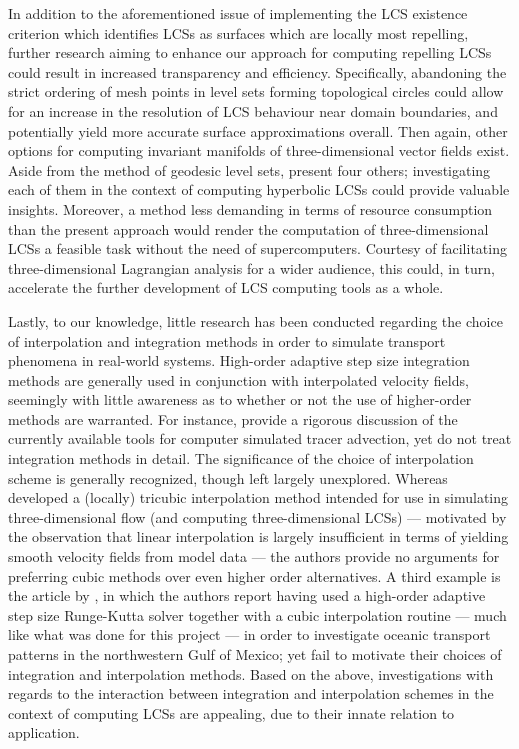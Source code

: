 In addition to the aforementioned issue of implementing the LCS existence
criterion which identifies LCSs as surfaces which are locally most repelling,
further research aiming to enhance our approach for computing repelling LCSs
could result in increased transparency and efficiency. Specifically,
abandoning the strict ordering of mesh points in level sets forming topological
circles could allow for an increase in the resolution of LCS behaviour near
domain boundaries, and potentially yield more accurate surface approximations
overall. Then again, other options for computing invariant manifolds of
three-dimensional vector fields exist. Aside from the method of geodesic level
sets, \textcite{krauskopf2005survey} present four others; investigating each of
them in the context of computing hyperbolic LCSs could provide valuable
insights. Moreover, a method less demanding in terms of resource
consumption than the present approach would render the computation of
three-dimensional LCSs a feasible task without the need of supercomputers.
Courtesy of facilitating three-dimensional Lagrangian analysis for a wider
audience, this could, in turn, accelerate the further development of LCS
computing tools as a whole.

Lastly, to our knowledge, little research has been conducted regarding the
choice of interpolation and integration methods in order to simulate transport
phenomena in real-world systems. High-order adaptive step size integration
methods are generally used in conjunction with interpolated velocity fields,
seemingly with little awareness as to whether or not the use of higher-order
methods are warranted. For instance, \textcite{vansebille2018lagrangian}
provide a rigorous discussion of the currently available tools for computer
simulated tracer advection, yet do not treat integration methods in detail.
The significance of the choice of interpolation scheme is generally recognized,
though left largely unexplored. Whereas \textcite{lekien2005tricubic} developed
a (locally) tricubic interpolation method intended for use in simulating
three-dimensional flow (and computing three-dimensional LCSs) --- motivated by
the observation that linear interpolation is largely insufficient in terms of
yielding smooth velocity fields from model data --- the authors provide no
arguments for preferring cubic methods over even higher order alternatives. A
third example is the article by \textcite{gough2017persistent}, in which the
authors report having used a high-order adaptive step size Runge-Kutta solver
together with a cubic interpolation routine --- much like what was done for
this project --- in order to investigate oceanic transport patterns in the
northwestern Gulf of Mexico; yet fail to motivate their choices of integration
and interpolation methods. Based on the above, investigations with regards to
the interaction between integration and interpolation schemes in the context
of computing LCSs are appealing, due to their innate relation to application.
